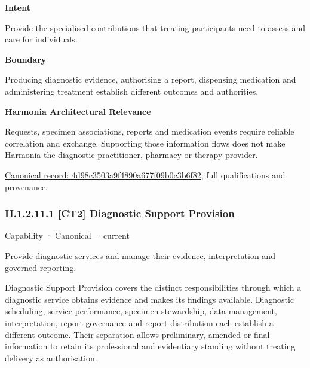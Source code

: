 \textbf{Intent}



Provide the specialised contributions that treating participants need to assess and care for individuals.



\textbf{Boundary}



Producing diagnostic evidence, authorising a report, dispensing medication and administering treatment establish different outcomes and authorities.



\textbf{Harmonia Architectural Relevance}



Requests, specimen associations, reports and medication events require reliable correlation and exchange. Supporting those information flows does not make Harmonia the diagnostic practitioner, pharmacy or therapy provider.


{\footnotesize \href{../../../../continuum/strategy/capability/4d98c3503a9f4890a677f09b0c3b6f82.md}{Canonical record: 4d98c3503a9f4890a677f09b0c3b6f82}; full qualifications and provenance.}\par
\subsubsection*{II.1.2.11.1 [CT2] Diagnostic Support Provision}
\label{navigation:II.1.2.11.1}

\label{element:827910cf74ae4061afbda52dde3da106}
{\small Capability · Canonical · current}\par

Provide diagnostic services and manage their evidence, interpretation and governed reporting.



Diagnostic Support Provision covers the distinct responsibilities through which a diagnostic service obtains evidence and makes its findings available. Diagnostic scheduling, service performance, specimen stewardship, data management, interpretation, report governance and report distribution each establish a different outcome. Their separation allows preliminary, amended or final information to retain its professional and evidentiary standing without treating delivery as authorisation.



